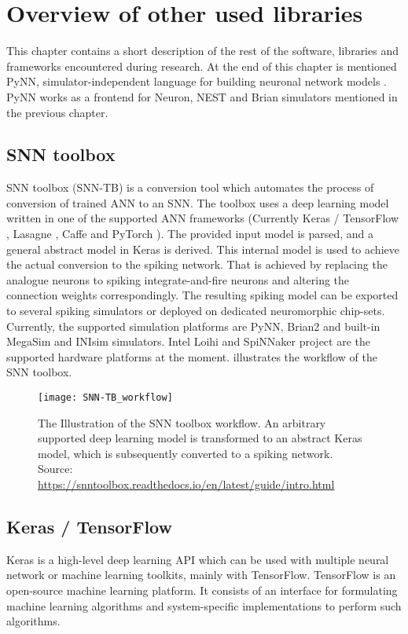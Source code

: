 \chapter{Overview of other used libraries} \label{chap:04}

This chapter contains a short description of the rest of the software, libraries and frameworks encountered during research. At the end of this chapter is mentioned PyNN, simulator-independent language for building neuronal network models \cite{davisonPyNNCommonInterface2009}. PyNN works as a frontend for Neuron, NEST and Brian simulators mentioned in the previous chapter.

\section{SNN toolbox}
SNN toolbox (SNN-TB) \cite{rueckauerConversionContinuousValuedDeep2017} is a conversion tool which automates the process of conversion of trained ANN to an SNN. The toolbox uses a deep learning model written in one of the supported ANN frameworks (Currently Keras / TensorFlow \cite{cholletKeras15}, Lasagne \cite{sanderdielemanLasagneFirst15}, Caffe \cite{jiaCaffeConvolutional14} and PyTorch \cite{paszkePyTorchImperative19}). The provided input model is parsed, and a general abstract model in Keras is derived. This internal model is used to achieve the actual conversion to the spiking network. That is achieved by replacing the analogue neurons to spiking integrate-and-fire neurons and altering the connection weights correspondingly. The resulting spiking model can be exported to several spiking simulators or deployed on dedicated neuromorphic chip-sets. Currently, the supported simulation platforms are PyNN, Brian2 and built-in MegaSim and INIsim simulators. Intel Loihi and SpiNNaker project are the supported hardware platforms at the moment.  illustrates the workflow of the SNN toolbox.

\begin{figure}[htbp]
    \centering
    \texttt{[image: SNN-TB\_workflow]}
    \caption{The Illustration of the SNN toolbox workflow. An arbitrary supported deep learning model is transformed to an abstract Keras model, which is subsequently converted to a spiking network. Source: \url{https://snntoolbox.readthedocs.io/en/latest/guide/intro.html}}
    \label{fig:snn-tb_workflow}
\end{figure}

\section{Keras / TensorFlow}
Keras is a high-level deep learning API which can be used with multiple neural network or machine learning toolkits, mainly with TensorFlow. TensorFlow is an open-source machine learning platform. It consists of an interface for formulating machine learning algorithms and system-specific implementations to perform such algorithms.

